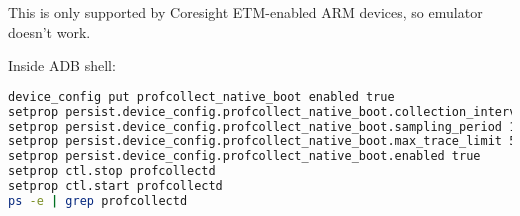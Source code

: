 This is only supported by Coresight ETM-enabled ARM devices, so emulator doesn't work.

Inside ADB shell:
\begin{lstlisting}[language=bash]
device_config put profcollect_native_boot enabled true
setprop persist.device_config.profcollect_native_boot.collection_interval 60
setprop persist.device_config.profcollect_native_boot.sampling_period 1000
setprop persist.device_config.profcollect_native_boot.max_trace_limit 53687091200
setprop persist.device_config.profcollect_native_boot.enabled true
setprop ctl.stop profcollectd
setprop ctl.start profcollectd
ps -e | grep profcollectd
\end{lstlisting}








